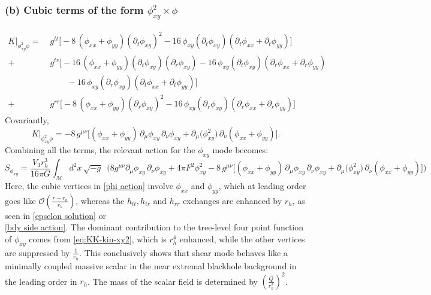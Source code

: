 \documentclass[a4paper,11pt]{article}
\begin{document}
\subsubsection*{(b) Cubic terms of the form $\phi_{xy}^2\times\phi$}
\begin{equation}
\begin{aligned}
K\Big|_{\phi_{xy}^2\phi}
=\;&g^{tt}\Big[-8\,(\phi_{xx}+\phi_{yy})(\partial_t\phi_{xy})^2
-16\,\phi_{xy}(\partial_t\phi_{xy})(\partial_t\phi_{xx}+\partial_t\phi_{yy})\Big]\\[4pt]
+\;&g^{tr}\Big[-16\,(\phi_{xx}+\phi_{yy})(\partial_t\phi_{xy})(\partial_r\phi_{xy})
-16\,\phi_{xy}(\partial_t\phi_{xy})(\partial_r\phi_{xx}+\partial_r\phi_{yy})\\
&\qquad-16\,\phi_{xy}(\partial_r\phi_{xy})(\partial_t\phi_{xx}+\partial_t\phi_{yy})\Big]\\[4pt]
+\;&g^{rr}\Big[-8\,(\phi_{xx}+\phi_{yy})(\partial_r\phi_{xy})^2
-16\,\phi_{xy}(\partial_r\phi_{xy})(\partial_r\phi_{xx}+\partial_r\phi_{yy})\Big]
\end{aligned}
\label{eq:KK-kin-xy2phi}
\end{equation}
Covariantly,
\begin{equation}
K\Big|_{\phi_{xy}^2\phi}=-8\,g^{\mu\nu}\Big[(\phi_{xx}+\phi_{yy})\,\partial_\mu\phi_{xy}\,\partial_\nu\phi_{xy}
+\partial_\mu\big(\phi_{xy}^2\big)\,\partial_\nu(\phi_{xx}+\phi_{yy})\Big].
\label{eq:KK-kin-xy2phi-cov}
\end{equation}
Combining all the terms, the relevant action for the $\phi_{xy}$ mode becomes:
\begin{equation}\label{phi action}
    S_{\phi_{xy}}=\frac{V_3 r_h^3}{16\pi G}\int_{\mathcal M} d^2x\,\sqrt{-g}\, \,\,\big(8 g^{\mu\nu}\partial_\mu\phi_{xy}\,\partial_\nu\phi_{xy}+ 4\pi F^2 \phi_{xy}^2 -8\,g^{\mu\nu}\Big[(\phi_{xx}+\phi_{yy})\,\partial_\mu\phi_{xy}\,\partial_\nu\phi_{xy}
+\partial_\mu\big(\phi_{xy}^2\big)\,\partial_\nu(\phi_{xx}+\phi_{yy})\Big] \big)
\end{equation}
Here, the cubic vertices in \ref{phi action} involve $\phi_{xx}$ and $\phi_{yy}$, which at leading order goes like $\mathcal{O}(\frac{r-r_h}{r_h})$,  whereas the $h_{tt}, h_{tr} \text{ and } h_{rr}$ exchanges are enhanced by $r_h$, as seen in \ref{epselon solution} or \\\ref{bdy side action}.  The dominant contribution to the tree-level four point function of $\phi_{xy}$ comes from \ref{eq:KK-kin-xy2}, which is $r_h^4$ enhanced, while the other vertices are suppressed by  $\frac{1}{r_h}$. This conclusively shows that shear mode behaves like a minimally coupled massive scalar in the near extremal blackhole background in the leading order in $r_h$. The mass of the scalar field is determined by $(\frac{Q}{r_h^3})^2$.
\end{document}

